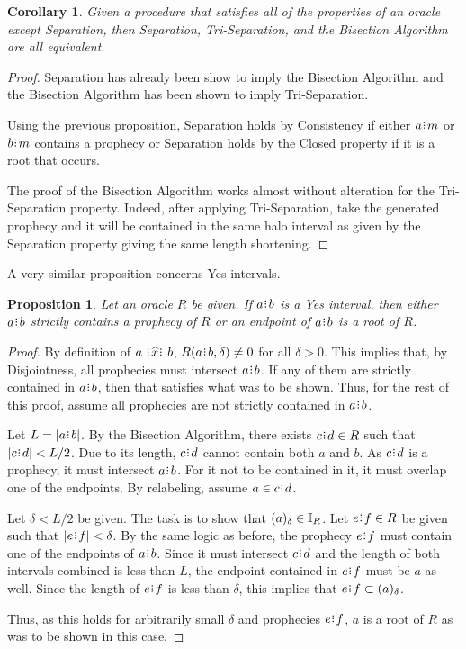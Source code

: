 \documentclass[12pt]{article}
\newtheorem{corollary}{Corollary}[section]
\newtheorem{proposition}{Proposition}[section]
\begin{document}
\begin{corollary}
    Given a procedure that satisfies all of the properties of an oracle except Separation, then Separation, Tri-Separation, and the Bisection Algorithm are all equivalent. 
\end{corollary}

\begin{proof}
    Separation has already been show to imply the Bisection Algorithm and the Bisection Algorithm has been shown to imply Tri-Separation. 

    Using the previous proposition, Separation holds by Consistency if either $a\rint m$ or $b\rint m$ contains a prophecy or Separation holds by the Closed property if it is a root that occurs. 

    The proof of the Bisection Algorithm works almost without alteration for the Tri-Separation property. Indeed, after applying Tri-Separation, take the generated prophecy and it will be contained in the same halo interval as given by the Separation property giving the same length shortening. 
\end{proof}


A very similar proposition concerns Yes intervals. 

\begin{proposition}\label{os-yescat}
    Let an oracle $R$ be given. If $a\rint b$ is a Yes interval, then either $a\rint b$ strictly contains a prophecy of $R$ or an endpoint of $a\rint b$ is a root of $R$. 
\end{proposition}

\begin{proof}
    By definition of $a \xora b$, $R(a\rint b, \delta) \neq 0$ for all $\delta > 0$. This implies that, by Disjointness, all prophecies must intersect $a\rint b$. If any of them are strictly contained in $a\rint b$, then that satisfies what was to be shown. Thus, for the rest of this proof, assume all prophecies are not strictly contained in $a\rint b$.

    Let $L = |a\rint b|$. By the Bisection Algorithm, there exists $c\rint d \in R$ such that $|c\rint d| < L/2$. Due to its length, $c\rint d$ cannot contain both $a$ and $b$. As $c\rint d$ is a prophecy, it must intersect $a\rint b$. For it not to be contained in it, it must overlap one of the endpoints. By relabeling, assume $a \in c\rint d$.
    
    Let $\delta < L/2$ be given. The task is to show that $(a)_{\delta} \in \mathbb{I}_R$. Let $e\rint f \in R$ be given such that $|e\rint f| < \delta$. By the same logic as before, the prophecy $e\rint f$ must contain one of the endpoints of $a\rint b$. Since it must intersect $c\rint d$ and the length of both intervals combined is less than $L$, the endpoint contained in $e\rint f$ must be $a$ as well. Since the length of $e\rint f$ is less than $\delta$, this implies that $e\rint f \subset \halo{a}$.

    Thus, as this holds for arbitrarily small $\delta$ and prophecies $e\rint f$, $a$ is a root of $R$ as was to be shown in this case. 
\end{proof}
\end{document}
